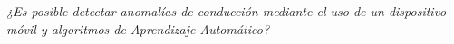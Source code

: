 \begin{center}
\textit{\LARGE{¿Es posible detectar anomal\'{i}as de conducci\'{o}n mediante el uso de un dispositivo móvil y algoritmos de Aprendizaje Autom\'{a}tico?}}
\end{center}


